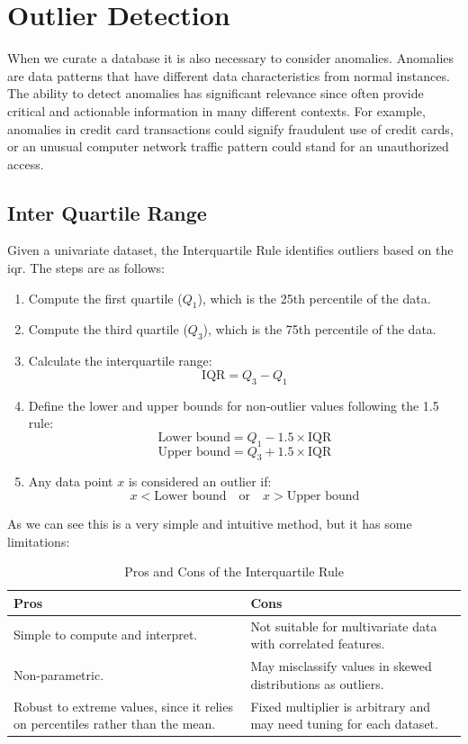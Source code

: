 \documentclass[11pt,english,a4paper,hidelinks]{book}
\begin{document}
\newpage
\section{Outlier Detection}
When we curate a database it is also necessary to consider anomalies. Anomalies are data patterns that have different data characteristics from normal
instances. The ability to detect anomalies has significant relevance since often provide critical and actionable information in many different contexts. For example, anomalies in credit card transactions could signify fraudulent use of
credit cards, or an unusual computer network traffic pattern could stand for an
unauthorized access.


\subsection{Inter Quartile Range}

Given a univariate dataset, the Interquartile Rule identifies outliers based on the \gls{iqr}. The steps are as follows:

\begin{enumerate}
    \item Compute the first quartile (\(Q_1\)), which is the 25th percentile of the data.
    \item Compute the third quartile (\(Q_3\)), which is the 75th percentile of the data.
    \item Calculate the interquartile range:
    \[
        \text{IQR} = Q_3 - Q_1
    \]
    \item Define the lower and upper bounds for non-outlier values following the 1.5 rule:
    \[
        \text{Lower bound} = Q_1 - 1.5 \times \text{IQR}
    \]
    \[
        \text{Upper bound} = Q_3 + 1.5 \times \text{IQR}
    \]
    \item Any data point \(x\) is considered an outlier if:
    \[
        x < \text{Lower bound} \quad \text{or} \quad x > \text{Upper bound}
    \]
\end{enumerate}

\noindent As we can see this is a very simple and intuitive method, but it has some limitations:

\begin{table}[H]
    \centering
    \begin{tabular}{|p{7cm}|p{7cm}|}
    \hline
    \textbf{Pros} & \textbf{Cons} \\
    \hline
    Simple to compute and interpret. & Not suitable for multivariate data with correlated features. \\
    \hline
    Non-parametric. & May misclassify values in skewed distributions as outliers. \\
    \hline
    Robust to extreme values, since it relies on percentiles rather than the mean. & Fixed multiplier is arbitrary and may need tuning for each dataset. \\
    \hline
    \end{tabular}
    \caption{Pros and Cons of the Interquartile Rule}
\end{table}
\end{document}
